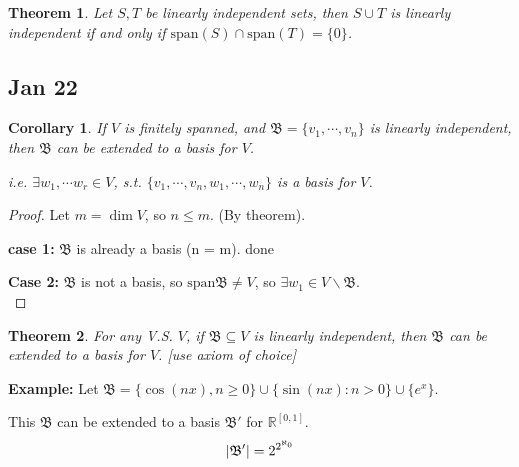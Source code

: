 \documentclass[12pt]{article}
\theoremstyle{plain}
\newtheorem{theorem}{Theorem}[subsection]
\newtheorem{corollary}{Corollary}[subsection]
\newcommand{\Span}{\mathrm{span}}
\newcommand{\abs}[1]{\left| #1 \right|}
\newcommand{\mR}{{\mathbb{R}}}
\begin{document}
	\begin{theorem}
		Let $S, T$ be linearly independent sets, then $S \cup T$ is linearly
		independent if and only if $\Span(S) \cap \Span(T) = \{0\}$. 
	\end{theorem}



	




	\newpage
	\subsection{Jan 22}
	\begin{corollary}
		If $V$ is finitely spanned, and $\mathfrak{B} = \{v_1, \cdots, v_n\}$
		is linearly independent, then $\mathfrak{B}$ can be extended to a basis
		for $V$. 

		i.e. $\exists w_1, \cdots w_r \in V$, s.t. $\{v_1, \cdots, v_n, 
		w_1, \cdots, w_n\}$ is a basis for $V$. 
	\end{corollary}
	\begin{proof}
		Let $m = \dim V$, so $n \leq m$. (By theorem).
		
		\textbf{case 1: } 
		$\mathfrak{B}$ is already a basis (n = m). done

		\textbf{Case 2:} 
		$\mathfrak{B}$ is not a basis, so $\Span \mathfrak{B} \neq V$, 
		so $\exists w_1 \in V\backslash \mathfrak{B}$. \\
	\end{proof}

	\begin{theorem}
		For any V.S. $V$, if $\mathfrak{B} \subseteq V$ is linearly 
		independent, then $\mathfrak{B}$ can be extended to a basis for $V$. 
		[use axiom of choice]\\
	\end{theorem}
	
	{\color{Brown}
		\textbf{Example:} 
		Let $\mathfrak{B} = \{\cos (nx), n\geq 0\}\cup\{\sin (nx): n >0\} 
		\cup \{e^x\}$.

		This $\mathfrak{B}$ can be extended to a basis $\mathfrak B'$ 
		for $\mR^{[0,1]}$. 
		\[
			\abs{\mathfrak{B}'} = 2^{2^{\aleph_0}}\\
		\]
	}
	
\end{document}
